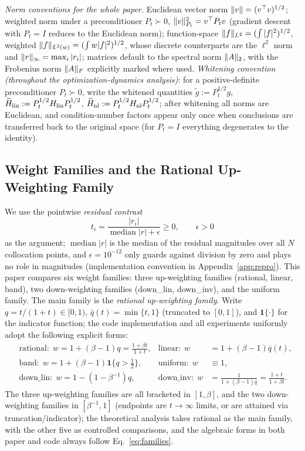 \documentclass[11pt]{article}
\DeclarePairedDelimiter{\norm}{\lVert}{\rVert}
\newcommand{\wt}[1]{\widetilde{#1}}
\numberwithin{equation}{section}
\begin{document}
\noindent\emph{Norm conventions for the whole paper.} Euclidean vector norm $\norm v=(v^\top v)^{1/2}$; weighted norm under a preconditioner $P_t\succ0$, $\norm v_{P_t}^2=v^\top P_t v$ (gradient descent with $P_t=I$ reduces to the Euclidean norm); function-space $\norm f_{L^2}=(\int|f|^2)^{1/2}$, weighted $\norm f_{L^2(w)}=(\int w|f|^2)^{1/2}$, whose discrete counterparts are the $\ell^2$ norm and $\norm r_\infty=\max_i|r_i|$; matrices default to the spectral norm $\norm A_2$, with the Frobenius norm $\norm A_F$ explicitly marked where used. \emph{Whitening convention (throughout the optimization-dynamics analysis)}: for a positive-definite preconditioner $P_t\succ0$, write the whitened quantities $\wt g:=P_t^{1/2}g$, $\wt H_{\rm lin}:=P_t^{1/2}H_{\rm lin}P_t^{1/2}$, $\wt H_{\rm nl}:=P_t^{1/2}H_{\rm nl}P_t^{1/2}$; after whitening all norms are Euclidean, and condition-number factors appear only once when conclusions are transferred back to the original space (for $P_t=I$ everything degenerates to the identity).

\subsection{Weight Families and the Rational Up-Weighting Family}\label{sec:family}
We use the pointwise \emph{residual contrast}
\begin{equation}\label{eq:t-contrast}
t_i=\frac{|r_i|}{\operatorname{median}|r|+\epsilon}\ge0,\qquad \epsilon>0
\end{equation}
as the argument; $\operatorname{median}|r|$ is the median of the residual magnitudes over all $N$ collocation points, and $\epsilon=10^{-12}$ only guards against division by zero and plays no role in magnitudes (implementation convention in Appendix~\ref{app:repro}). This paper compares six weight families: three up-weighting families (rational, linear, band), two down-weighting families (down\_lin, down\_inv), and the uniform family. The main family is the \emph{rational up-weighting family}. Write $q=t/(1+t)\in[0,1)$, $\bar q(t)=\min\{t,1\}$ (truncated to $[0,1]$), and $\mathbf 1\{\cdot\}$ for the indicator function; the code implementation and all experiments uniformly adopt the following explicit forms:
\begin{equation}\label{eq:families}
\begin{aligned}
&\text{rational:}\ \ w=1+(\beta-1)q=\tfrac{1+\beta t}{1+t},
&\text{linear:}\ \ w&=1+(\beta-1)\bar q(t),\\
&\text{band:}\ \ w=1+(\beta-1)\mathbf 1\{q>\tfrac12\},
&\text{uniform:}\ \ w&\equiv1,\\
&\text{down\_lin:}\ \ w=1-(1-\beta^{-1})q,
&\text{down\_inv:}\ \ w&=\tfrac{1}{1+(\beta-1)q}=\tfrac{1+t}{1+\beta t}.
\end{aligned}
\end{equation}
The three up-weighting families are all bracketed in $[1,\beta]$, and the two down-weighting families in $[\beta^{-1},1]$ (endpoints are $t\to\infty$ limits, or are attained via truncation/indicator); the theoretical analysis takes rational as the main family, with the other five as controlled comparisons, and the algebraic forms in both paper and code always follow Eq.~\eqref{eq:families}.
\end{document}
